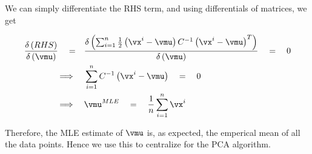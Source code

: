 \documentclass{article}
\begin{document}
\begin{mlsolution}
\begin{addmargin}{1.5em}
		We can simply differentiate the RHS term, and using differentials of matrices, we get

		\begin{align*}
			\derp{RHS}{\vmu}	\eq&	\derp{\sum_{i = 1}^{n} \frac{1}{2} \para{\vx^i - \vmu} C^{-1} \para{\vx^i - \vmu}^T}{\vmu}	\eq	0 \\
								\qimpl&	\sum_{i = 1}^{n} C^{-1} \para{\vx^i - \vmu}	\eq	0 \\
								\qimpl&	\vmu^{MLE}	\eq	\frac{1}{n} \sum_{i = 1}^{n} \vx^i
		\end{align*}

		Therefore, the MLE estimate of $\vmu$ is, as expected, the emperical mean of all the data points. Hence we use this to centralize for the PCA algorithm.

	\end{addmargin}

\end{mlsolution}
\end{document}
